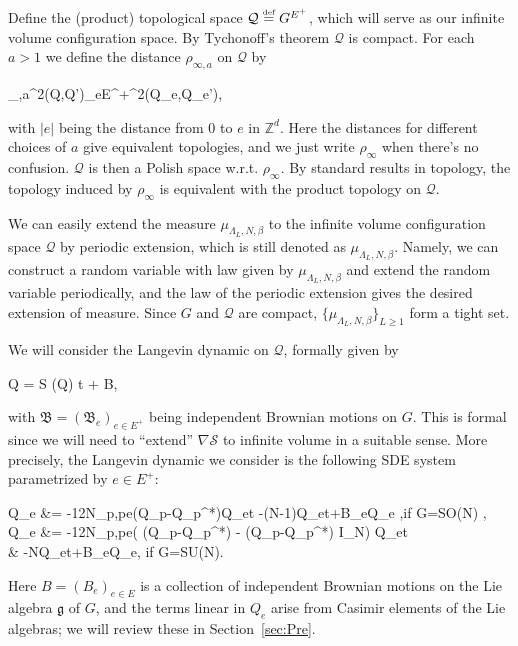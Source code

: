 \documentclass[11pt,UTF-8,reqno]{amsart}
\numberwithin{equation}{section}
\def\tr{\mathrm {tr}}
\def\dif{{\mathord{{\rm d}}}}
\newcommand{\eqdef}{\stackrel{\mbox{\tiny def}}{=}}
\def\cP{{\mathcal P}}
\def\cQ{{\mathcal Q}}
\def\cS{{\mathcal S}}
\def\mZ{{\mathbb Z}}
\def\ge{\geqslant}
\def\tr{\mathrm {tr}}
\def\dif{{\mathord{{\rm d}}}}
\def\tr{{\rm Tr}}
\def\mfg{\mathfrak{g}}
\def\ge{\geqslant}
\begin{document}
Define the (product) topological space $\cQ\eqdef G^{E^+}$,
which will serve as our infinite volume configuration space.
By Tychonoff's theorem $\cQ$ is compact.
For each $a>1$
we define the distance $\rho_{\infty,a}$ on $\cQ$  by
\begin{equ}
	\rho_{\infty,a}^2(Q,Q')\eqdef \sum_{e\in E^+}\rho^2(Q_e,Q_e'),
\end{equ}
with $|e|$ being  the distance from $0$  to $e$ in $\mZ^d$.
Here the distances for different choices of $a$
 give equivalent topologies,  and we just write $\rho_\infty$ when there's no confusion.
 $\cQ$ is then a Polish space w.r.t. $\rho_\infty$.
 By standard results in topology, the topology induced by  $\rho_\infty$ is equivalent with the product topology on $\cQ$.

We can easily extend the measure $\mu_{\Lambda_{L}, N, \beta}$ to the infinite volume configuration space $\cQ$ by periodic extension, which is still denoted as $\mu_{\Lambda_{L}, N, \beta}$.
Namely, we can construct a random variable with law given by
$\mu_{\Lambda_{L}, N, \beta}$ and extend the random variable periodically,
and the law of the periodic extension gives the desired extension of measure.
 Since $G$ and $\cQ$ are compact,  $\{\mu_{\Lambda_L,N,\beta}\}_{L\ge 1}$ form a tight set.

We will consider the Langevin dynamic on $\cQ$, formally given by
\begin{equ}[e:YM-formal]
	\dif Q = \nabla \mathcal S (Q) \dif t + \sqrt{2}\dif \mathfrak B\;,
\end{equ}
with $\mathfrak B=(\mathfrak B_e)_{e\in E^+}$ being independent Brownian motions on $G$.
This is formal since we will need to ``extend'' $\nabla\cS$ to infinite volume
in a suitable sense. More precisely, the Langevin dynamic we consider is the following SDE system parametrized by $e\in E^+$:
\begin{equs}[eq:YM in]
	\dif Q_e
	&= -\frac12N\beta \sum_{p\in \cP,p\succ e}(Q_p-Q_p^*)Q_e\dif t
	-(N-1)Q_e\dif t+\sqrt2\dif B_eQ_e ,\qquad \mbox{if} \quad G=SO(N) ,
	\\
	\dif Q_e
	&= -\frac12N\beta \sum_{p\in \cP,p\succ e}\Big( (Q_p-{Q}_p^{*}) - \frac{1}{N}\tr(Q_p-{Q}_p^{*}) I_N\Big)   Q_e\dif t
	\\
	&\qquad\qquad\qquad\qquad\qquad\qquad\quad
	-NQ_e\dif t+\sqrt2\dif B_eQ_e, \qquad\qquad \mbox{if} \quad G=SU(N).
\end{equs}
 Here $B=(B_e)_{e\in E}$ is a collection of independent Brownian motions on the Lie algebra $\mfg$ of $G$,
and the terms linear in $Q_e$ arise from Casimir elements of the Lie algebras; we will review
these in Section~\ref{sec:Pre}.
\end{document}
